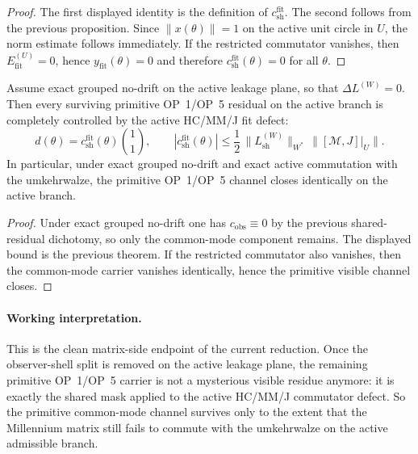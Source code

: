 \begin{proof}
The first displayed identity is the definition of $c_{\mathrm{sh}}^{\mathrm{fit}}$. The second follows from the previous proposition. Since $\|x(\theta)\|=1$ on the active unit circle in $U$, the norm estimate follows immediately. If the restricted commutator vanishes, then $E_{\mathrm{fit}}^{(U)}=0$, hence $y_{\mathrm{fit}}(\theta)=0$ and therefore $c_{\mathrm{sh}}^{\mathrm{fit}}(\theta)=0$ for all $\theta$.
\end{proof}

\begin{corollary}
Assume exact grouped no-drift on the active leakage plane, so that $\Delta L^{(W)}=0$. Then every surviving primitive OP~1/OP~5 residual on the active branch is completely controlled by the active HC/MM/J fit defect:
\[
  d(\theta)=c_{\mathrm{sh}}^{\mathrm{fit}}(\theta)\binom{1}{1},
  \qquad
  |c_{\mathrm{sh}}^{\mathrm{fit}}(\theta)|
  \le
  \frac12\,\|L_{\mathrm{sh}}^{(W)}\|_{W^*}\,\|[\mathcal M,J]\big|_{U}\|.
\]
In particular, under exact grouped no-drift and exact active commutation with the umkehrwalze, the primitive OP~1/OP~5 channel closes identically on the active branch.
\end{corollary}

\begin{proof}
Under exact grouped no-drift one has $c_{\mathrm{obs}}\equiv 0$ by the previous shared-residual dichotomy, so only the common-mode component remains. The displayed bound is the previous theorem. If the restricted commutator also vanishes, then the common-mode carrier vanishes identically, hence the primitive visible channel closes.
\end{proof}

\paragraph{Working interpretation.}
This is the clean matrix-side endpoint of the current reduction. Once the observer-shell split is removed on the active leakage plane, the remaining primitive OP~1/OP~5 carrier is not a mysterious visible residue anymore: it is exactly the shared mask applied to the active HC/MM/J commutator defect. So the primitive common-mode channel survives only to the extent that the Millennium matrix still fails to commute with the umkehrwalze on the active admissible branch.



